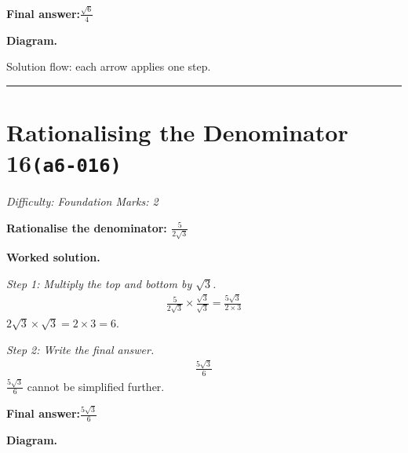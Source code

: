 \documentclass[11pt]{article}
\newcommand{\question}[1]{\par\medskip\noindent\textbf{#1}\par}
\begin{document}
\begin{answerbox}
\textbf{Final answer:}\quad \(\displaystyle \frac{\sqrt{6}}{4}\)
\end{answerbox}
\textbf{Diagram.}

\begin{center}
\end{center}
\small Solution flow: each arrow applies one step.\normalsize

\medskip\hrule

\section*{Rationalising the Denominator 16\quad\small\texttt{(a6-016)}}
\textit{Difficulty: Foundation \quad\textbar\quad Marks: 2}

\question{Rationalise the denominator: \( \frac{5}{2\sqrt{3}} \)}

\textbf{Worked solution.}

\textit{Step 1: Multiply the top and bottom by \( \sqrt{3} \).}
\[\begin{gathered}
\frac{5}{2\sqrt{3}} \times \frac{\sqrt{3}}{\sqrt{3}} = \frac{5\sqrt{3}}{2 \times 3}
\end{gathered}\]
\( 2\sqrt{3} \times \sqrt{3} = 2 \times 3 = 6 \).

\textit{Step 2: Write the final answer.}
\[\begin{gathered}
\frac{5\sqrt{3}}{6}
\end{gathered}\]
\( \frac{5\sqrt{3}}{6} \) cannot be simplified further.

\begin{answerbox}
\textbf{Final answer:}\quad \(\displaystyle \frac{5\sqrt{3}}{6}\)
\end{answerbox}
\textbf{Diagram.}
\end{document}

